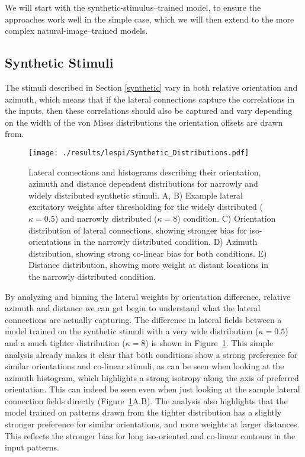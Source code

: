 We will start with the synthetic-stimulus--trained model, to ensure
the approaches work well in the simple case, which we will then extend
to the more complex natural-image--trained models.

\subsection{Synthetic Stimuli}

The stimuli described in Section \ref{synthetic} vary in both relative
orientation and azimuth, which means that if the lateral connections
capture the correlations in the inputs, then these correlations should
also be captured and vary depending on the width of the von Mises
distributions the orientation offsets are drawn from.

\begin{figure}
	\centering
    \texttt{[image: ./results/lespi/Synthetic\_Distributions.pdf]}
	\caption[Distributions of lateral connections of models trained on
      synthetic stimuli]{Lateral connections and histograms describing
      their orientation, azimuth and distance dependent distributions
      for narrowly and widely distributed synthetic stimuli. A, B)
      Example lateral excitatory weights after thresholding for the
      widely distributed ($\kappa=0.5$) and narrowly distributed
      ($\kappa=8$) condition. C) Orientation distribution of lateral
      connections, showing stronger bias for iso-orientations in the
      narrowly distributed condition. D) Azimuth distribution, showing
      strong co-linear bias for both conditions. E) Distance
      distribution, showing more weight at distant locations in the
      narrowly distributed condition.}
	\label{SyntheticDistributions}
\end{figure}

By analyzing and binning the lateral weights by orientation
difference, relative azimuth and distance we can get begin to
understand what the lateral connections are actually capturing. The
difference in lateral fields between a model trained on the synthetic
stimuli with a very wide distribution ($\kappa=0.5$) and a much
tighter distribution ($\kappa=8$) is shown in
Figure~\ref{SyntheticDistributions}. This simple analysis already
makes it clear that both conditions show a strong preference for
similar orientations and co-linear stimuli, as can be seen when
looking at the azimuth histogram, which highlights a strong isotropy
along the axis of preferred orientation. This can indeed be seen even
when just looking at the sample lateral connection fields directly
(Figure~\ref{SyntheticDistributions}A,B). The analysis also highlights
that the model trained on patterns drawn from the tighter distribution
has a slightly stronger preference for similar orientations, and more
weights at larger distances. This reflects the stronger bias for long
iso-oriented and co-linear contours in the input patterns.

